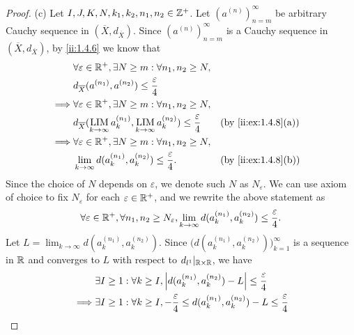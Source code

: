 \begin{proof}{(c)}
  Let \(I, J, K, N, k_1, k_2, n_1, n_2 \in \mathbb{Z}^+\).
  Let \((a^{(n)})_{n = m}^\infty\) be arbitrary Cauchy sequence in \((\overline{X}, d_{\overline{X}})\).
  Since \((a^{(n)})_{n = m}^\infty\) is a Cauchy sequence in \((\overline{X}, d_{\overline{X}})\), by \cref{ii:1.4.6} we know that
  \begin{align*}
             & \forall \varepsilon \in \R^+, \exists N \geq m : \forall n_1, n_2 \geq N,                                                               \\
             & d_{\overline{X}}(a^{(n_1)}, a^{(n_2)}) \leq \dfrac{\varepsilon}{4}                                                                      \\
    \implies & \forall \varepsilon \in \R^+, \exists N \geq m : \forall n_1, n_2 \geq N,                                                               \\
             & d_{\overline{X}}(\LIM_{k \to \infty} a_k^{(n_1)}, \LIM_{k \to \infty} a_k^{(n_2)}) \leq \dfrac{\varepsilon}{4} &  & \by{ii:ex:1.4.8}[a] \\
    \implies & \forall \varepsilon \in \R^+, \exists N \geq m : \forall n_1, n_2 \geq N,                                                               \\
             & \lim_{k \to \infty} d(a_k^{(n_1)}, a_k^{(n_2)}) \leq \dfrac{\varepsilon}{4}.                                   &  & \by{ii:ex:1.4.8}[b]
  \end{align*}
  Since the choice of \(N\) depends on \(\varepsilon\), we denote such \(N\) as \(N_\varepsilon\).
  We can use axiom of choice to fix \(N_\varepsilon\) for each \(\varepsilon \in \mathbb{R}^+\), and we rewrite the above statement as
  \[
    \forall \varepsilon \in \mathbb{R}^+, \forall n_1, n_2 \geq N_\varepsilon, \lim_{k \to \infty} d(a_k^{(n_1)}, a_k^{(n_2)}) \leq \dfrac{\varepsilon}{4}.
  \]
  Let \(L = \lim_{k \to \infty} d(a_k^{(n_1)}, a_k^{(n_2)})\).
  Since \(\Big(d(a_k^{(n_1)}, a_k^{(n_2)})\Big)_{k = 1}^\infty\) is a sequence in \(\mathbb{R}\) and converges to \(L\) with respect to \(d_{l^1}|_{\mathbb{R} \times \mathbb{R}}\), we have
  \begin{align*}
             & \exists I \geq 1 : \forall k \geq I, \abs{d(a_k^{(n_1)}, a_k^{(n_2)}) - L} \leq \dfrac{\varepsilon}{4}                                                                                              \\
    \implies & \exists I \geq 1 : \forall k \geq I, -\dfrac{\varepsilon}{4} \leq d(a_k^{(n_1)}, a_k^{(n_2)}) - L \leq \dfrac{\varepsilon}{4}                                                                       \\

\end{align*}
\end{proof}
